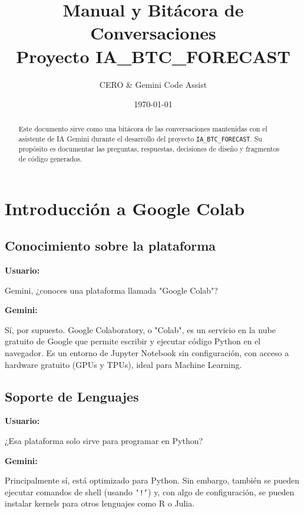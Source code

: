 \documentclass[12pt, a4paper]{article}
\newenvironment{usuario}{\par\noindent\textbf{Usuario:}\itshape\par\ignorespaces}{\par}
\newenvironment{gemini}{\par\noindent\textbf{Gemini:}\par\ignorespaces}{\par}
\begin{document}
\title{Manual y Bitácora de Conversaciones \\ Proyecto IA\_BTC\_FORECAST}
\author{CERO \& Gemini Code Assist}
\date{\today}
\maketitle

\begin{abstract}
    Este documento sirve como una bitácora de las conversaciones mantenidas con el asistente de IA Gemini durante el desarrollo del proyecto \texttt{IA\_BTC\_FORECAST}. Su propósito es documentar las preguntas, respuestas, decisiones de diseño y fragmentos de código generados.
\end{abstract}

\tableofcontents
\newpage

\section{Introducción a Google Colab}

\subsection{Conocimiento sobre la plataforma}

\begin{usuario}
Gemini, ¿conoces una plataforma llamada "Google Colab"?
\end{usuario}

\begin{gemini}
Sí, por supuesto. Google Colaboratory, o "Colab", es un servicio en la nube gratuito de Google que permite escribir y ejecutar código Python en el navegador. Es un entorno de Jupyter Notebook sin configuración, con acceso a hardware gratuito (GPUs y TPUs), ideal para Machine Learning.
\end{gemini}

\subsection{Soporte de Lenguajes}

\begin{usuario}
¿Esa plataforma solo sirve para programar en Python?
\end{usuario}

\begin{gemini}
Principalmente sí, está optimizado para Python. Sin embargo, también se pueden ejecutar comandos de shell (usando \texttt{`!`}) y, con algo de configuración, se pueden instalar kernels para otros lenguajes como R o Julia.
\end{gemini}
\end{document}
